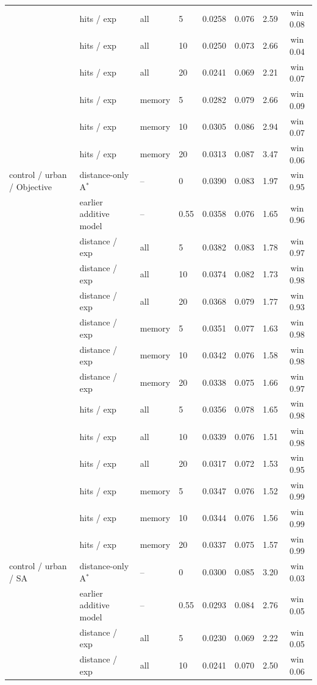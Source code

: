 \begin{tabular}{llllcccc}
 & hits / exp & all & 5 & 0.0258 & 0.076 & 2.59 & win 0.08 \\
 & hits / exp & all & 10 & 0.0250 & 0.073 & 2.66 & win 0.04 \\
 & hits / exp & all & 20 & 0.0241 & 0.069 & 2.21 & win 0.07 \\
 & hits / exp & memory & 5 & 0.0282 & 0.079 & 2.66 & win 0.09 \\
 & hits / exp & memory & 10 & 0.0305 & 0.086 & 2.94 & win 0.07 \\
 & hits / exp & memory & 20 & 0.0313 & 0.087 & 3.47 & win 0.06 \\
\midrule
control / urban / Objective & distance-only A$^*$ & -- & 0 & 0.0390 & 0.083 & 1.97 & win 0.95 \\
 & earlier additive model & -- & 0.55 & 0.0358 & 0.076 & 1.65 & win 0.96 \\
 & distance / exp & all & 5 & 0.0382 & 0.083 & 1.78 & win 0.97 \\
 & distance / exp & all & 10 & 0.0374 & 0.082 & 1.73 & win 0.98 \\
 & distance / exp & all & 20 & 0.0368 & 0.079 & 1.77 & win 0.93 \\
 & distance / exp & memory & 5 & 0.0351 & 0.077 & 1.63 & win 0.98 \\
 & distance / exp & memory & 10 & 0.0342 & 0.076 & 1.58 & win 0.98 \\
 & distance / exp & memory & 20 & 0.0338 & 0.075 & 1.66 & win 0.97 \\
 & hits / exp & all & 5 & 0.0356 & 0.078 & 1.65 & win 0.98 \\
 & hits / exp & all & 10 & 0.0339 & 0.076 & 1.51 & win 0.98 \\
 & hits / exp & all & 20 & 0.0317 & 0.072 & 1.53 & win 0.95 \\
 & hits / exp & memory & 5 & 0.0347 & 0.076 & 1.52 & win 0.99 \\
 & hits / exp & memory & 10 & 0.0344 & 0.076 & 1.56 & win 0.99 \\
 & hits / exp & memory & 20 & 0.0337 & 0.075 & 1.57 & win 0.99 \\
\midrule
control / urban / SA & distance-only A$^*$ & -- & 0 & 0.0300 & 0.085 & 3.20 & win 0.03 \\
 & earlier additive model & -- & 0.55 & 0.0293 & 0.084 & 2.76 & win 0.05 \\
 & distance / exp & all & 5 & 0.0230 & 0.069 & 2.22 & win 0.05 \\
 & distance / exp & all & 10 & 0.0241 & 0.070 & 2.50 & win 0.06 \\

\end{tabular}
